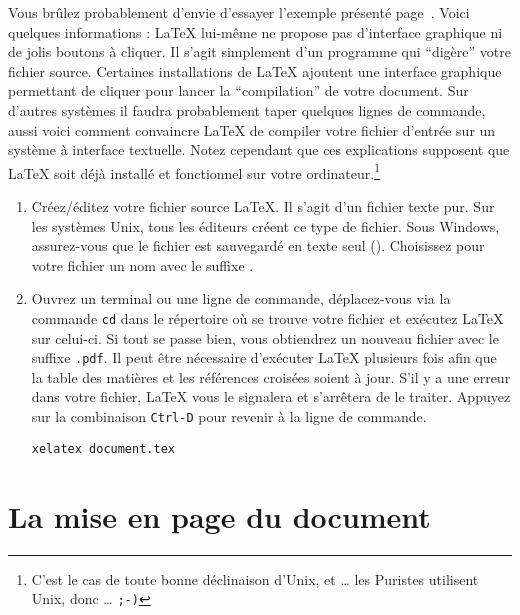 Vous brûlez probablement d'envie d'essayer l'exemple présenté
page~\pageref{mini}. Voici quelques informations : \LaTeX{} lui-même
ne propose pas d'interface graphique ni de jolis boutons à cliquer. Il
s'agit simplement d'un programme qui \enquote{digère} votre fichier
source. Certaines installations de \LaTeX{} ajoutent une interface
graphique permettant de cliquer pour lancer la \enquote{compilation} de votre
document. Sur d'autres systèmes il faudra probablement taper quelques
lignes de commande, aussi voici comment convaincre \LaTeX{} de
compiler votre fichier d'entrée sur un système à interface
textuelle. Notez cependant que ces explications supposent que \LaTeX{}
soit déjà installé et fonctionnel sur votre ordinateur.\footnote{
C'est le cas de toute bonne déclinaison d'Unix, et \ldots{} les
Puristes utilisent Unix, donc \ldots{} \texttt{;-)}}

\begin{enumerate}
\item Créez/éditez votre fichier source \LaTeX{}. Il s'agit d'un
      fichier texte pur. Sur les systèmes Unix, tous les éditeurs
      créent ce type de fichier. Sous Windows, assurez-vous que le
      fichier est sauvegardé en texte seul (). Choisissez pour
      votre fichier un nom avec le suffixe .

\item


Ouvrez un terminal ou une ligne de commande, déplacez-vous via la
commande \texttt{cd} dans le répertoire où se trouve votre fichier et
exécutez \LaTeX{} sur celui-ci. Si tout se passe bien, vous
obtiendrez un nouveau fichier avec le suffixe \texttt{.pdf}. Il peut
être nécessaire d'exécuter \LaTeX{} plusieurs fois afin que la table
des matières et les références croisées soient à jour. S'il y a une
erreur dans votre fichier, \LaTeX{} vous le signalera et s'arrêtera de le traiter.
Appuyez sur la combinaison \texttt{Ctrl-D} pour revenir à la ligne de
commande.
\begin{lscommand}
\verb+xelatex document.tex+
\end{lscommand}

\end{enumerate}

\section{La mise en page du document}

